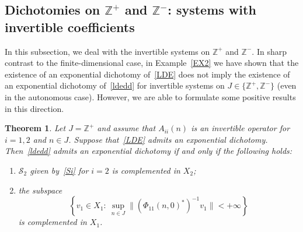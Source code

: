 \documentclass[11pt,reqno,a4paper]{amsart}
\theoremstyle{plain}
\numberwithin{equation}{section}
\newtheorem{theorem}{Theorem}
\theoremstyle{remark}
\def\Z{\mathbb{Z}}
\begin{document}

\subsection{Dichotomies on $\Z^+$ and $\Z^-$: systems with invertible coefficients}

In this subsection, we deal with the invertible systems on $\Z^+$ and $\Z^-$. In sharp contrast to the finite-dimensional case, in Example~\ref{EX2} we have shown that the existence of an exponential dichotomy of~\eqref{LDE} does not imply the existence of an exponential dichotomy of~\eqref{ldedd} for invertible systems on $J\in \{\Z^+, \Z^-\}$ (even in the autonomous case). However, we are able to formulate some positive results in this direction.
\begin{theorem}\label{504thm}
Let $J=\mathbb Z^+$ and assume that $A_{ii}(n)$ is an invertible operator for $i=1, 2$ and $n\in J$. Suppose that~\eqref{LDE} admits an exponential dichotomy. Then~\eqref{ldedd} admits an exponential dichotomy if and only if  the following holds:
\begin{enumerate}
\item $\mathcal S_2$ given by~\eqref{Si} for $i=2$ is complemented in $X_2$;
\item the subspace 
\begin{equation}\label{subspace}
\left \{ v_1\in X_1: \ \sup_{n\in J}\|(\Phi_{11}(n, 0)^*)^{-1}v_1\|<+\infty \right \}
\end{equation}
is complemented in $X_1$.
\end{enumerate}
\end{theorem}
\end{document}

